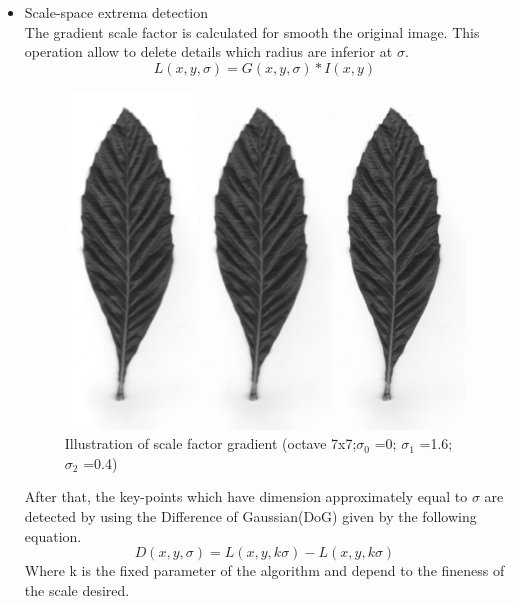 \documentclass[12pt]{article}
\begin{document}
\begin{itemize}
\item Scale-space extrema detection\\
The gradient scale factor is calculated for smooth the original image. This operation allow to delete details which radius are inferior at $\sigma$.
\begin{equation}
L(x,y,\sigma)=G(x,y,\sigma)*I(x,y)
\end{equation}

\begin{figure}[h]
    \center
    \includegraphics[scale=0.3]{blur.jpg}
    \caption{Illustration of scale factor gradient (octave 7x7;$\sigma_0$ =0; $\sigma_1$ =1.6; $\sigma_2$ =0.4) }\label{figure:Illustration of the scale factor gradient}
\end{figure}
After that, the key-points which have dimension approximately equal to $\sigma$ are detected by using the Difference of Gaussian(DoG) given by the following equation.
\begin{equation}
D(x,y,\sigma)=L(x,y,k\sigma)-L(x,y,k\sigma)
\end{equation}
Where k is the fixed parameter of the algorithm and depend to the fineness of the scale desired.
\begin{figure}[h]
    \center

\end{figure}
\end{itemize}
\end{document}
